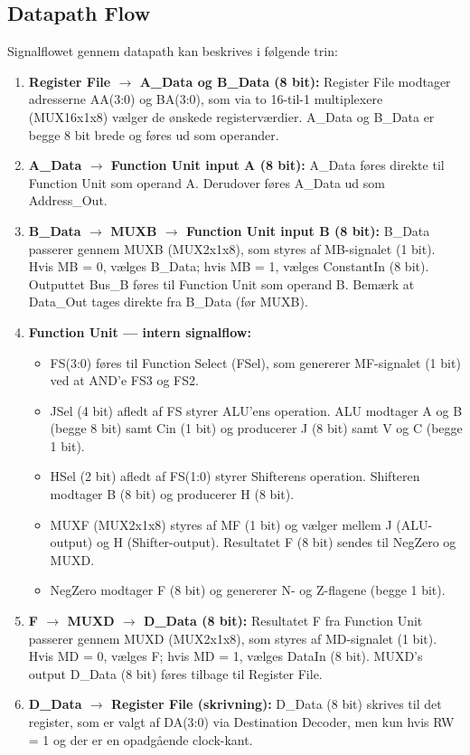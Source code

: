 \documentclass{article}
\begin{document}
\subsection{Datapath Flow}
\label{sec:datapath-flow}

Signalflowet gennem datapath kan beskrives i følgende trin:

\begin{enumerate}
    \item \textbf{Register File $\rightarrow$ A\_Data og B\_Data (8 bit):} Register File modtager adresserne AA(3:0) og BA(3:0), som via to 16-til-1 multiplexere (MUX16x1x8) vælger de ønskede registerværdier. A\_Data og B\_Data er begge 8 bit brede og føres ud som operander.

    \item \textbf{A\_Data $\rightarrow$ Function Unit input A (8 bit):} A\_Data føres direkte til Function Unit som operand A. Derudover føres A\_Data ud som Address\_Out.

    \item \textbf{B\_Data $\rightarrow$ MUXB $\rightarrow$ Function Unit input B (8 bit):} B\_Data passerer gennem MUXB (MUX2x1x8), som styres af MB-signalet (1 bit). Hvis MB = 0, vælges B\_Data; hvis MB = 1, vælges ConstantIn (8 bit). Outputtet Bus\_B føres til Function Unit som operand B. Bemærk at Data\_Out tages direkte fra B\_Data (før MUXB).

    \item \textbf{Function Unit --- intern signalflow:}
    \begin{itemize}
        \item FS(3:0) føres til Function Select (FSel), som genererer MF-signalet (1 bit) ved at AND'e FS3 og FS2.
        \item JSel (4 bit) afledt af FS styrer ALU'ens operation. ALU modtager A og B (begge 8 bit) samt Cin (1 bit) og producerer J (8 bit) samt V og C (begge 1 bit).
        \item HSel (2 bit) afledt af FS(1:0) styrer Shifterens operation. Shifteren modtager B (8 bit) og producerer H (8 bit).
        \item MUXF (MUX2x1x8) styres af MF (1 bit) og vælger mellem J (ALU-output) og H (Shifter-output). Resultatet F (8 bit) sendes til NegZero og MUXD.
        \item NegZero modtager F (8 bit) og genererer N- og Z-flagene (begge 1 bit).
    \end{itemize}

    \item \textbf{F $\rightarrow$ MUXD $\rightarrow$ D\_Data (8 bit):} Resultatet F fra Function Unit passerer gennem MUXD (MUX2x1x8), som styres af MD-signalet (1 bit). Hvis MD = 0, vælges F; hvis MD = 1, vælges DataIn (8 bit). MUXD's output D\_Data (8 bit) føres tilbage til Register File.

    \item \textbf{D\_Data $\rightarrow$ Register File (skrivning):} D\_Data (8 bit) skrives til det register, som er valgt af DA(3:0) via Destination Decoder, men kun hvis RW = 1 og der er en opadgående clock-kant.
\end{enumerate}
\end{document}
